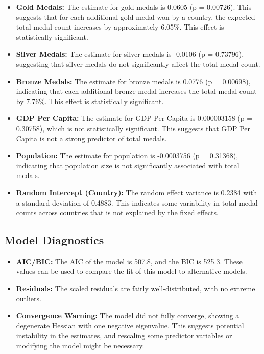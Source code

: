 \documentclass[a4paper,12pt]{article}
\begin{document}
\begin{itemize}
    \item \textbf{Gold Medals:} The estimate for gold medals is 0.0605 (p = 0.00726). This suggests that for each additional gold medal won by a country, the expected total medal count increases by approximately 6.05\%. This effect is statistically significant.
    \item \textbf{Silver Medals:} The estimate for silver medals is -0.0106 (p = 0.73796), suggesting that silver medals do not significantly affect the total medal count.
    \item \textbf{Bronze Medals:} The estimate for bronze medals is 0.0776 (p = 0.00698), indicating that each additional bronze medal increases the total medal count by 7.76\%. This effect is statistically significant.
    \item \textbf{GDP Per Capita:} The estimate for GDP Per Capita is 0.000003158 (p = 0.30758), which is not statistically significant. This suggests that GDP Per Capita is not a strong predictor of total medals.
    \item \textbf{Population:} The estimate for population is -0.0003756 (p = 0.31368), indicating that population size is not significantly associated with total medals.
    \item \textbf{Random Intercept (Country):} The random effect variance is 0.2384 with a standard deviation of 0.4883. This indicates some variability in total medal counts across countries that is not explained by the fixed effects.
\end{itemize}



\subsection{Model Diagnostics}

\begin{itemize}
    \item \textbf{AIC/BIC:} The AIC of the model is 507.8, and the BIC is 525.3. These values can be used to compare the fit of this model to alternative models.
    \item \textbf{Residuals:} The scaled residuals are fairly well-distributed, with no extreme outliers.
    \item \textbf{Convergence Warning:} The model did not fully converge, showing a degenerate Hessian with one negative eigenvalue. This suggests potential instability in the estimates, and rescaling some predictor variables or modifying the model might be necessary.
\end{itemize}
\end{document}
